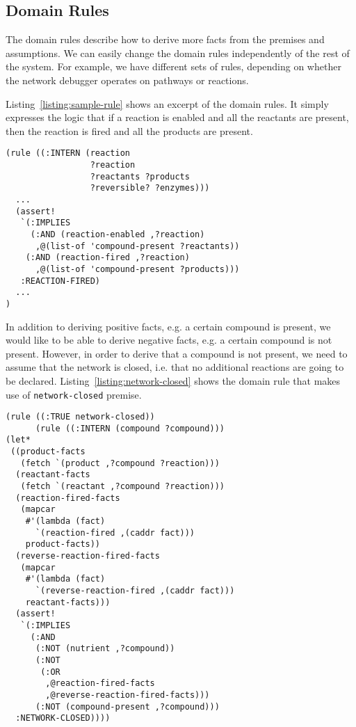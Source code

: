 \subsection{Domain Rules}
\label{sec:domain-rules}

The domain rules describe how to derive more facts from the premises
and assumptions. We can easily change the domain rules independently
of the rest of the system. For example, we have different sets of
rules, depending on whether the network debugger operates on pathways
or reactions.

Listing~\ref{listing:sample-rule} shows an excerpt of the domain
rules. It simply expresses the logic that if a reaction is enabled and
all the reactants are present, then the reaction is fired and all the
products are present.

\begin{lstlisting}[label={listing:sample-rule},caption={Excerpt of Domain Rules}]
(rule ((:INTERN (reaction 
                 ?reaction 
                 ?reactants ?products 
                 ?reversible? ?enzymes)))
  ...
  (assert! 
   `(:IMPLIES
     (:AND (reaction-enabled ,?reaction)
      ,@(list-of 'compound-present ?reactants))
    (:AND (reaction-fired ,?reaction)
      ,@(list-of 'compound-present ?products)))
   :REACTION-FIRED)
  ...
)
\end{lstlisting}

In addition to deriving positive facts, e.g. a certain compound is
present, we would like to be able to derive negative facts, e.g. a
certain compound is not present. However, in order to derive that a
compound is not present, we need to assume that the network is closed,
i.e. that no additional reactions are going to be
declared. Listing~\ref{listing:network-closed} shows the domain rule
that makes use of {\small\tt network-closed} premise.

\begin{lstlisting}[label={listing:network-closed},caption={Domain rule for deriving absence of compound}]
(rule ((:TRUE network-closed))
      (rule ((:INTERN (compound ?compound)))
(let* 
 ((product-facts 
   (fetch `(product ,?compound ?reaction)))
  (reactant-facts 
   (fetch `(reactant ,?compound ?reaction)))
  (reaction-fired-facts 
   (mapcar 
    #'(lambda (fact) 
      `(reaction-fired ,(caddr fact))) 
    product-facts))
  (reverse-reaction-fired-facts 
   (mapcar 
    #'(lambda (fact) 
      `(reverse-reaction-fired ,(caddr fact))) 
    reactant-facts)))
  (assert! 
   `(:IMPLIES 
     (:AND
      (:NOT (nutrient ,?compound))
      (:NOT 
       (:OR 
        ,@reaction-fired-facts 
        ,@reverse-reaction-fired-facts)))
      (:NOT (compound-present ,?compound)))
  :NETWORK-CLOSED))))
\end{lstlisting}

